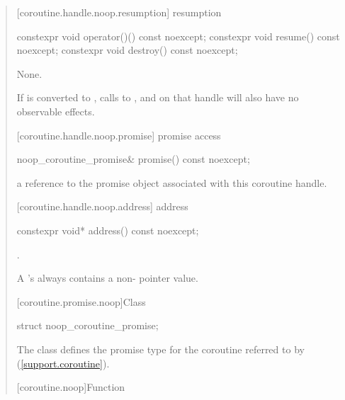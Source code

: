 \begin{quote}
[coroutine.handle.noop.resumption]{ resumption}
\begin{itemdecl}
  constexpr void operator()() const noexcept;
  constexpr void resume() const noexcept;
  constexpr void destroy() const noexcept;
\end{itemdecl}

\begin{itemdescr}
  \pnum
  \effects None.
  
  \pnum
  \remarks If  is converted to , calls to ,  and  on that handle will also have no observable effects.
\end{itemdescr}

[coroutine.handle.noop.promise]{ promise access}
\begin{itemdecl}
  noop_coroutine_promise& promise() const noexcept;
\end{itemdecl}

\begin{itemdescr}
  \pnum
  \returns a reference to the promise object associated with this coroutine handle.
\end{itemdescr}

[coroutine.handle.noop.address]{ address}
\begin{itemdecl}
  constexpr void* address() const noexcept;
\end{itemdecl}

\begin{itemdescr}
  \pnum
  \returns {}.

  \pnum
  \remarks A 's  always contains a non- pointer value.
\end{itemdescr}

[coroutine.promise.noop]{Class }
\begin{itemdecl}
  struct noop_coroutine_promise{};
\end{itemdecl}

\begin{itemdescr}
  \pnum The class  defines the promise type for the coroutine referred to by  (\ref{support.coroutine}).
\end{itemdescr}

[coroutine.noop]{Function }


\end{quote}
